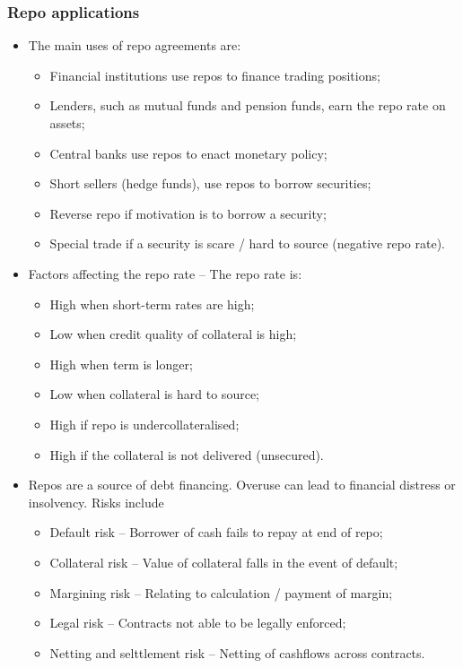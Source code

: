 \documentclass[../notes_compiled.tex]{subfiles}
\begin{document}
\subsubsection{Repo applications}
\begin{itemize}
\item The main uses of repo agreements are:
\begin{itemize}
\item Financial institutions use repos to finance trading positions;
\item Lenders, such as mutual funds and pension funds, earn the repo rate on assets;
\item Central banks use repos to enact monetary policy;
\item Short sellers (hedge funds), use repos to borrow securities;
\item Reverse repo if motivation is to borrow a security;
\item Special trade if a security is scare / hard to source (negative repo rate).
\end{itemize}
\item Factors affecting the repo rate -- The repo rate is:
\begin{itemize}
\item High when short-term rates are high;
\item Low when credit quality of collateral is high;
\item High when term is longer;
\item Low when collateral is hard to source;
\item High if repo is undercollateralised;
\item High if the collateral is not delivered (unsecured).
\end{itemize}
\item Repos are a source of debt financing. Overuse can lead to financial distress or insolvency. Risks include
\begin{itemize}
\item Default risk -- Borrower of cash fails to repay at end of repo;
\item Collateral risk -- Value of collateral falls in the event of default;
\item Margining risk -- Relating to calculation / payment of margin;
\item Legal risk -- Contracts not able to be legally enforced;
\item Netting and selttlement risk -- Netting of cashflows across contracts.
\end{itemize}

\end{itemize}
\end{document}
